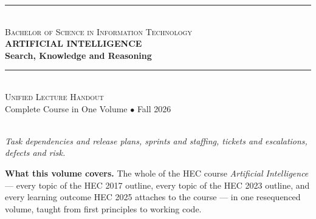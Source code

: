 \thispagestyle{empty}

\begin{center}
\vspace*{1.0cm}

{\color{secondary}\rule{0.85\textwidth}{2pt}}\\[6pt]
{\large\textsc{\color{secondary}Bachelor of Science in Information Technology}}\\[18pt]

{\Huge\bfseries\color{primary}ARTIFICIAL INTELLIGENCE}\\[10pt]
{\LARGE\bfseries\color{primary}Search, Knowledge and Reasoning}\\[16pt]

{\color{secondary}\rule{0.85\textwidth}{2pt}}\\[16pt]

{\Large\textsc{Unified Lecture Handout}}\\[6pt]
{\large\color{gray!70!black}Complete Course in One Volume $\bullet$ Fall 2026}\\[24pt]

\\[10pt]
{\small\itshape\color{gray!70!black}Task dependencies and release plans, sprints and
staffing, tickets and escalations, defects and risk.}

\vspace{1.2cm}

\begin{tcolorbox}[enhanced, width=0.86\textwidth, colback=lightbg,
  colframe=primary, boxrule=0pt, leftrule=4pt, arc=2pt, top=6pt, bottom=6pt]
\small
\textbf{\color{primary}What this volume covers.} The whole of the HEC course
\emph{Artificial Intelligence} --- every topic of the HEC 2017 outline, every
topic of the HEC 2023 outline, and every learning outcome HEC 2025 attaches to
the course --- in one resequenced volume, taught from first principles to working
code.


\end{tcolorbox}
\end{center}
